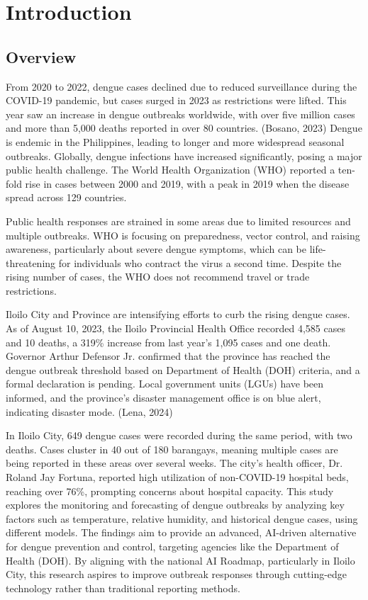 \chapter{Introduction}
\label{sec:researchdesc}    %

\section{Overview}
\label{sec:overview}

From 2020 to 2022, dengue cases declined due to reduced surveillance during the COVID-19 pandemic, but cases surged in 2023 as restrictions were lifted. This year saw an increase in dengue outbreaks worldwide, with over five million cases and more than 5,000 deaths reported in over 80 countries. (Bosano, 2023) Dengue is endemic in the Philippines, leading to longer and more widespread seasonal outbreaks. Globally, dengue infections have increased significantly, posing a major public health challenge. The World Health Organization (WHO) reported a ten-fold rise in cases between 2000 and 2019, with a peak in 2019 when the disease spread across 129 countries.

Public health responses are strained in some areas due to limited resources and multiple outbreaks. WHO is focusing on preparedness, vector control, and raising awareness, particularly about severe dengue symptoms, which can be life-threatening for individuals who contract the virus a second time. Despite the rising number of cases, the WHO does not recommend travel or trade restrictions.

Iloilo City and Province are intensifying efforts to curb the rising dengue cases. As of August 10, 2023, the Iloilo Provincial Health Office recorded 4,585 cases and 10 deaths, a 319\% increase from last year’s 1,095 cases and one death. Governor Arthur Defensor Jr. confirmed that the province has reached the dengue outbreak threshold based on Department of Health (DOH) criteria, and a formal declaration is pending. Local government units (LGUs) have been informed, and the province's disaster management office is on blue alert, indicating disaster mode. (Lena, 2024)

In Iloilo City, 649 dengue cases were recorded during the same period, with two deaths. Cases cluster in 40 out of 180 barangays, meaning multiple cases are being reported in these areas over several weeks. The city’s health officer, Dr. Roland Jay Fortuna, reported high utilization of non-COVID-19 hospital beds, reaching over 76\%, prompting concerns about hospital capacity.  
This study explores the monitoring and forecasting of dengue outbreaks by analyzing key factors such as temperature, relative humidity, and historical dengue cases, using different models. The findings aim to provide an advanced, AI-driven alternative for dengue prevention and control, targeting agencies like the Department of Health (DOH). By aligning with the national AI Roadmap, particularly in Iloilo City, this research aspires to improve outbreak responses through cutting-edge technology rather than traditional reporting methods.

